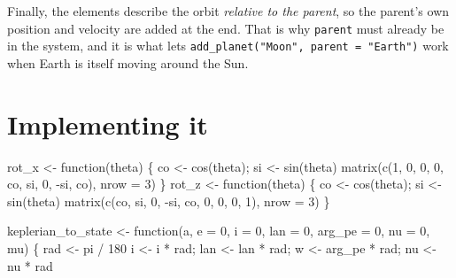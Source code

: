 \documentclass[
  10.5pt,
  letterpaper,
]{scrbook}
\newenvironment{Shaded}{\begin{snugshade}}{\end{snugshade}}
\newcommand{\AttributeTok}[1]{\textcolor[rgb]{0.00,0.00,0.00}{#1}}
\newcommand{\ControlFlowTok}[1]{\textcolor[rgb]{0.00,0.00,0.00}{#1}}
\newcommand{\DecValTok}[1]{\textcolor[rgb]{0.00,0.00,0.00}{#1}}
\newcommand{\FunctionTok}[1]{\textcolor[rgb]{0.00,0.00,0.00}{#1}}
\newcommand{\NormalTok}[1]{\textcolor[rgb]{0.00,0.00,0.00}{#1}}
\newcommand{\OtherTok}[1]{\textcolor[rgb]{0.00,0.00,0.00}{#1}}
\newcommand{\SpecialCharTok}[1]{\textcolor[rgb]{0.00,0.00,0.00}{#1}}
\theoremstyle{definition}
\theoremstyle{plain}
\theoremstyle{remark}
\begin{document}
Finally, the elements describe the orbit \emph{relative to the parent},
so the parent's own position and velocity are added at the end. That is
why \texttt{parent} must already be in the system, and it is what lets
\texttt{add\_planet("Moon",\ parent\ =\ "Earth")} work when Earth is
itself moving around the Sun.

\section{Implementing it}\label{implementing-it}

\begin{Shaded}
\begin{Highlighting}[]
\NormalTok{rot\_x }\OtherTok{\textless{}{-}} \ControlFlowTok{function}\NormalTok{(theta) \{}
\NormalTok{  co }\OtherTok{\textless{}{-}} \FunctionTok{cos}\NormalTok{(theta); si }\OtherTok{\textless{}{-}} \FunctionTok{sin}\NormalTok{(theta)}
  \FunctionTok{matrix}\NormalTok{(}\FunctionTok{c}\NormalTok{(}\DecValTok{1}\NormalTok{, }\DecValTok{0}\NormalTok{, }\DecValTok{0}\NormalTok{,   }\DecValTok{0}\NormalTok{, co, si,   }\DecValTok{0}\NormalTok{, }\SpecialCharTok{{-}}\NormalTok{si, co), }\AttributeTok{nrow =} \DecValTok{3}\NormalTok{)}
\NormalTok{\}}
\NormalTok{rot\_z }\OtherTok{\textless{}{-}} \ControlFlowTok{function}\NormalTok{(theta) \{}
\NormalTok{  co }\OtherTok{\textless{}{-}} \FunctionTok{cos}\NormalTok{(theta); si }\OtherTok{\textless{}{-}} \FunctionTok{sin}\NormalTok{(theta)}
  \FunctionTok{matrix}\NormalTok{(}\FunctionTok{c}\NormalTok{(co, si, }\DecValTok{0}\NormalTok{,   }\SpecialCharTok{{-}}\NormalTok{si, co, }\DecValTok{0}\NormalTok{,   }\DecValTok{0}\NormalTok{, }\DecValTok{0}\NormalTok{, }\DecValTok{1}\NormalTok{), }\AttributeTok{nrow =} \DecValTok{3}\NormalTok{)}
\NormalTok{\}}

\NormalTok{keplerian\_to\_state }\OtherTok{\textless{}{-}} \ControlFlowTok{function}\NormalTok{(a, }\AttributeTok{e =} \DecValTok{0}\NormalTok{, }\AttributeTok{i =} \DecValTok{0}\NormalTok{, }\AttributeTok{lan =} \DecValTok{0}\NormalTok{, }\AttributeTok{arg\_pe =} \DecValTok{0}\NormalTok{,}
                               \AttributeTok{nu =} \DecValTok{0}\NormalTok{, mu) \{}
\NormalTok{  rad }\OtherTok{\textless{}{-}}\NormalTok{ pi }\SpecialCharTok{/} \DecValTok{180}
\NormalTok{  i }\OtherTok{\textless{}{-}}\NormalTok{ i }\SpecialCharTok{*}\NormalTok{ rad; lan }\OtherTok{\textless{}{-}}\NormalTok{ lan }\SpecialCharTok{*}\NormalTok{ rad; w }\OtherTok{\textless{}{-}}\NormalTok{ arg\_pe }\SpecialCharTok{*}\NormalTok{ rad; nu }\OtherTok{\textless{}{-}}\NormalTok{ nu }\SpecialCharTok{*}\NormalTok{ rad}


\end{Highlighting}
\end{Shaded}
\end{document}
